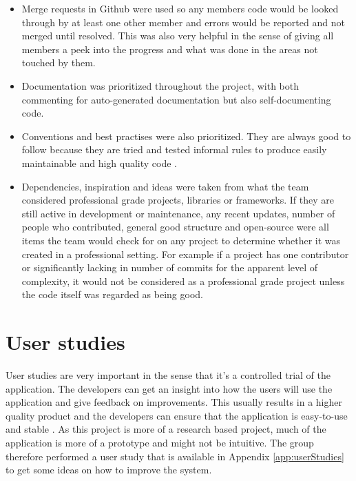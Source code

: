 \begin{itemize}
    \item Merge requests in Github were used so any members code would be looked through by at least one other member and errors would be reported and not merged until resolved. This was also very helpful in the sense of giving all members a peek into the progress and what was done in the areas not touched by them. 
    \item Documentation was prioritized throughout the project, with both commenting for auto-generated documentation but also self-documenting code.
    \item Conventions and best practises were also prioritized. They are always good to follow because they are tried and tested informal rules to produce easily maintainable and high quality code \cite{wiki:bestCodingPractises}. 
    \item Dependencies, inspiration and ideas were taken from what the team considered professional grade projects, libraries or frameworks. If they are still active in development or maintenance, any recent updates, number of people who contributed, general good structure and open-source were all items the team would check for on any project to determine whether it was created in a professional setting. For example if a project has one contributor or significantly lacking in number of commits for the apparent level of complexity, it would not be considered as a professional grade project unless the code itself was regarded as being good. %
\end{itemize}

\section{User studies}
User studies are very important in the sense that it's a controlled trial of the application. The developers can get an insight into how the users will use the application and give feedback on improvements. This usually results in a higher quality product and the developers can ensure that the application is easy-to-use and stable \cite{kosara2003user, sridhar1995understandingTheUser}. As this project is more of a research based project, much of the application is more of a prototype and might not be intuitive. The group therefore performed a user study that is available in Appendix \ref{app:userStudies} to get some ideas on how to improve the system.

